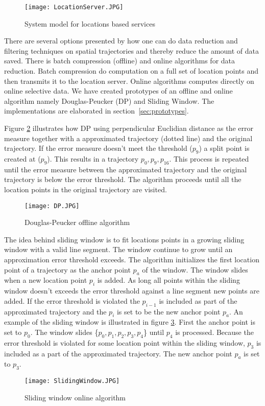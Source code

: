 \begin{figure}[H]
\centering
\texttt{[image: LocationServer.JPG]}

\caption{System model for locations based services}
\label{fig:system_model_for_locations_based_services}
\end{figure}


There are several options presented by \cite{Lee2011} how one can do data reduction and filtering techniques on spatial trajectories and thereby reduce the amount of data saved. There is batch compression (offline) and online algorithms for data reduction. Batch compression do computation on a full set of location points and then transmits it to the location server. Online algorithms computes directly on online selective data. We have created prototypes  of an offline and online algorithm namely Douglas-Peucker (DP) and Sliding Window. The implementations are elaborated in section~\ref{sec:prototypes}. 

Figure \ref{fig:douglas_peucker_algorithm} illustrates how DP using perpendicular Euclidian distance as the error measure together with a approximated trajectory (dotted line) and the original trajectory. If the error measure doesn't meet the threshold ($p_9$) a split point is created at ($p_9$). This results in a trajectory $p_0,p_9,p_{16}$. This process is repeated until the error measure between the approximated trajectory and the original trajectory is below the error threshold. The algorithm proceeds until all the location points in the original trajectory are visited.   

\begin{figure}[H]
\centering
\texttt{[image: DP.JPG]}
\caption{Douglas-Peucker offline algorithm}
\label{fig:douglas_peucker_algorithm}
\end{figure}


The idea behind sliding window is to fit locations points in a growing sliding window with a valid line segment. The window continue to grow until an approximation error threshold exceeds. The algorithm initializes the first location point of a trajectory as the anchor point $p_a$ of the window. The window slides when a new location point $p_i$ is added. As long all points within the sliding window doesn't exceeds the error threshold against a line segment new points are added. If the error threshold is violated the $p_{i-1}$ is included as part of the approximated trajectory and the $p_i$ is set to be the new anchor point $p_a$. An example of the sliding window is illustrated in figure \ref{fig:sliding_window_algorithm}. First the anchor point is set to $p_0$. The window slides \{$p_0,p_1,p_2,p_3,p_4$\} until $p_4$ is processed. Because the error threshold is violated for some location point within the sliding window, $p_3$ is included as a part of the approximated trajectory. The new anchor point $p_a$ is set to $p_3$.       
\begin{figure}[H]
\centering
\texttt{[image: SlidingWindow.JPG]}

\caption{Sliding window online algorithm}
\label{fig:sliding_window_algorithm}
\end{figure}


